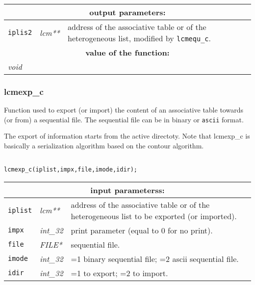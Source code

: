 \vskip 0.8cm

\noindent
\begin{tabular}{|p{1.5cm}|p{2cm}|p{11cm}|}
\hline
\multicolumn{3}{|c|}{\bf output parameters:} \\
\hline
{\tt iplis2} & {\it lcm**} & address of the associative table or of the heterogeneous list, modified by {\tt lcmequ\_c}. \\
\hline
\multicolumn{3}{|c|}{\bf value of the function:} \\
\hline
\multicolumn{2}{|l|}{\it void} &  \\
\hline
\end{tabular}

\subsubsection{lcmexp\_c}

Function used to export (or import) the content of an associative table towards (or from) a sequential file. The sequential file
can be in binary or {\tt ascii} format.

\vskip 0.4cm

The export of information starts from the active directoty. Note that {lcmexp\_c} is basically a serialization algorithm
based on the contour algorithm.

\begin{verbatim}

lcmexp_c(iplist,impx,file,imode,idir);
\end{verbatim}

\noindent
\begin{tabular}{|p{1.5cm}|p{2cm}|p{11cm}|}
\hline
\multicolumn{3}{|c|}{\bf input parameterss:} \\
\hline
{\tt iplist} & {\it lcm**} & address of the associative table or of the heterogeneous list to be exported (or imported). \\
\hline
{\tt impx} & {\it int\_32} & print parameter (equal to 0 for no print). \\
\hline
{\tt file} & {\it FILE*} & sequential file. \\
\hline
{\tt imode} & {\it int\_32} & =1 binary sequential file; 
                                    =2 {\sc ascii} sequential file. \\
\hline
{\tt idir} & {\it int\_32} & =1 to export; =2 to import. \\
\hline
\end{tabular}

\vskip 0.8cm

